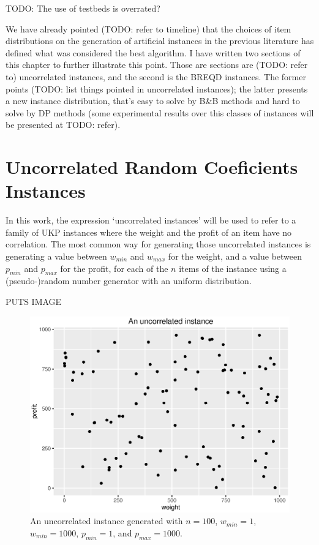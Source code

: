 TODO: The use of testbeds is overrated?

We have already pointed (TODO: refer to timeline) that the choices of item distributions on the generation of artificial instances in the previous literature has defined what was considered the best algorithm. I have written two sections of this chapter to further illustrate this point. Those are sections are (TODO: refer to) uncorrelated instances, and the second is the BREQD instances. The former points (TODO: list things pointed in uncorrelated instances); the latter presents a new instance distribution, that's easy to solve by B\&B methods and hard to solve by DP methods (some experimental results over this classes of instances will be presented at TODO: refer).

\section{Uncorrelated Random Coeficients Instances}

In this work, the expression `uncorrelated instances' will be used to refer to a family of UKP instances where the weight and the profit of an item have no correlation. The most common way for generating those uncorrelated instances is generating a value between \(w_{min}\) and \(w_{max}\) for the weight, and a value between \(p_{min}\) and \(p_{max}\) for the profit, for each of the \(n\) items of the instance using a (pseudo-)random number generator with an uniform distribution. %

PUTS IMAGE
\begin{figure}
    \caption{An uncorrelated instance generated with \(n = 100\), \(w_{min} = 1\), \(w_{min} = 1000\), \(p_{min} = 1\), and \(p_{max} = 1000\).}
    \begin{center}
    \includegraphics[scale=1]{uncorrelated.eps}
    \end{center}
    \label{fig:uncorrelated_example}
\end{figure}

